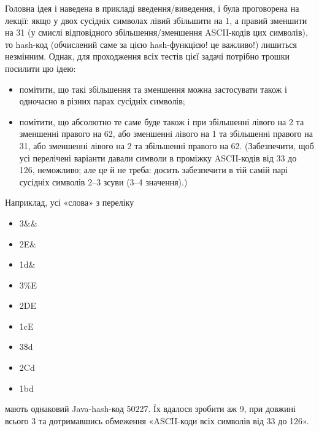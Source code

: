 Головна ідея і наведена в прикладі введення/виведення, і була проговорена на лекції: якщо у двох сусідніх символах лівий збільшити на 1, а правий зменшити на 31 (у смислі відповідного збільшення/зменшення ASCII-кодів цих символів), то hash-код (обчислений саме за цією hash-функцією! це важливо!) лишиться незмінним. Однак, для проходження всіх тестів цієї задачі потрібно трошки посилити цю ідею:

\begin{itemize}
\item
    помітити, що такі збільшення та зменшення можна застосувати також і одночасно в різних парах сусідніх символів;
\item
    помітити, що абсолютно те саме буде також і при збільшенні лівого на 2 та зменшенні правого на 62, або зменшенні лівого на 1 та збільшенні правого на 31, або зменшенні лівого на 2 та збільшенні правого на 62. (Забезпечити, щоб усі перелічені варіанти давали символи в проміжку ASCII-кодів від 33 до 126, неможливо; але це й не треба: досить забезпечити в тій самій парі сусідніх символів 2–3 зсуви (3–4 значення).)
\end{itemize}

Наприклад, усі «слова» з переліку

\begin{itemize}
\item
    3\&\&
\item
    2E\&
\item
    1d\&
\item
    3\%E
\item
    2DE
\item
    1cE
\item
    3\$d
\item
    2Cd
\item
    1bd
\end{itemize}
мають однаковий Java-hash-код 50227. Їх вдалося зробити аж 9, при довжині всього 3 та дотримавшись обмеження «ASCII-коди всіх символів від 33 до 126». 